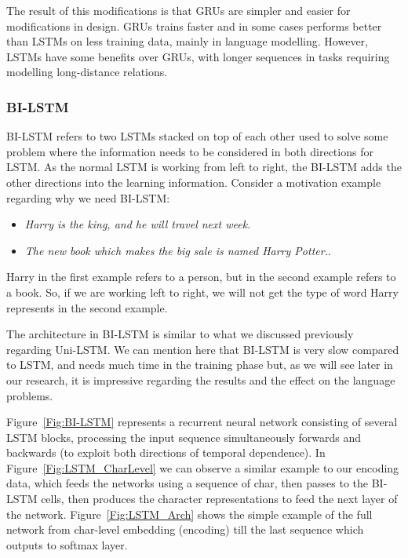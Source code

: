 The result of this modifications is that GRUs are simpler and easier for modifications in design. GRUs trains faster and in some cases performs better than LSTMs on less training data, mainly in language modelling. However, LSTMs have some benefits over GRUs, with longer sequences in tasks requiring modelling long-distance relations.

\subsubsection{BI-LSTM}\label{Sec:Bi_Lstm}

BI-LSTM refers to two LSTMs stacked on top of each other used to solve some problem where the information needs to be considered in both directions for LSTM. As the normal LSTM is working from left to right, the BI-LSTM adds the other directions into the learning information. Consider a motivation example regarding why we need BI-LSTM:

\begin{itemize}
\item \textit{Harry is the king, and he will travel next week.}
\item \textit{The new book which makes the big sale is named Harry Potter.}.
\end{itemize}

Harry in the first example refers to a person, but in the second example refers to a book. So, if we are working left to right, we will not get the type of word Harry represents in the second example.

The architecture in BI-LSTM is similar to what we discussed previously regarding Uni-LSTM. We can mention here that BI-LSTM is very slow compared to LSTM, and needs much time in the training phase but, as we will see later in our research, it is impressive regarding the results and the effect on the language problems.

Figure~\ref{Fig:BI-LSTM} represents a recurrent neural network consisting of several LSTM blocks, processing the input sequence simultaneously forwards and backwards (to exploit both directions of temporal dependence). In Figure~\ref{Fig:LSTM_CharLevel} we can observe a similar example to our encoding data, which feeds the networks using a sequence of char, then passes to the BI-LSTM cells, then produces the character representations to feed the next layer of the network. Figure~\ref{Fig:LSTM_Arch} shows the simple example of the full network from char-level embedding (encoding) till the last sequence which outputs to softmax layer.

